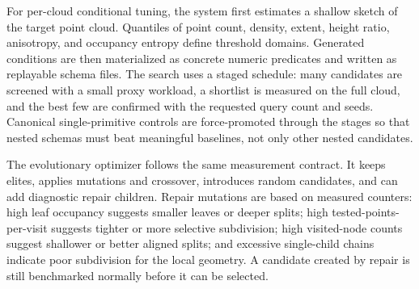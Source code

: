 For per-cloud conditional tuning, the system first estimates a shallow sketch of the target point cloud. Quantiles of point count, density, extent, height ratio, anisotropy, and occupancy entropy define threshold domains. Generated conditions are then materialized as concrete numeric predicates and written as replayable schema files. The search uses a staged schedule: many candidates are screened with a small proxy workload, a shortlist is measured on the full cloud, and the best few are confirmed with the requested query count and seeds. Canonical single-primitive controls are force-promoted through the stages so that nested schemas must beat meaningful baselines, not only other nested candidates.

The evolutionary optimizer follows the same measurement contract. It keeps elites, applies mutations and crossover, introduces random candidates, and can add diagnostic repair children. Repair mutations are based on measured counters: high leaf occupancy suggests smaller leaves or deeper splits; high tested-points-per-visit suggests tighter or more selective subdivision; high visited-node counts suggest shallower or better aligned splits; and excessive single-child chains indicate poor subdivision for the local geometry. A candidate created by repair is still benchmarked normally before it can be selected.

